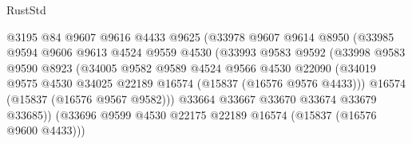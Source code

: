 \begin{lexlean}{RustStd}
\begin{coremodule}
                                    @3195
                                    @84
                                    @9607
                                    @9616
                                    @4433
                                    @9625
                                    (@33978
                                      @9607
                                      @9614
                                      @8950
                                      (@33985
                                        @9594
                                        @9606
                                        @9613
                                        @4524
                                        @9559
                                        @4530
                                        (@33993
                                          @9583
                                          @9592
                                          (@33998
                                            @9583
                                            @9590
                                            @8923
                                            (@34005
                                              @9582
                                              @9589
                                              @4524
                                              @9566
                                              @4530
                                              @22090
                                              (@34019
                                                @9575
                                                @4530
                                                @34025
                                                @22189
                                                @16574
                                                (@15837 (@16576 @9576 @4433)))
                                              @16574
                                              (@15837 (@16576 @9567 @9582)))
                                            @33664
                                            @33667
                                            @33670
                                            @33674
                                            @33679
                                            @33685))
                                        (@33696
                                          @9599
                                          @4530
                                          @22175
                                          @22189
                                          @16574
                                          (@15837 (@16576 @9600 @4433)))

\end{coremodule}
\end{lexlean}
